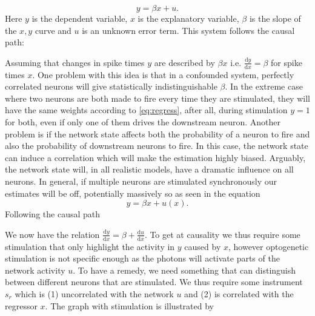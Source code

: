 \documentclass[11pt]{article}
\newcommand{\de}[2]{\frac{\mathrm{d} #1}{\mathrm{d} #2}}
\begin{document}
\begin{equation}
y = \beta x + u.
\label{eq:regress}
\end{equation}
Here $ y $ is the dependent variable, $ x $ is the explanatory variable, $ \beta $ is the slope of the $ x,y $ curve and $ u $ is an unknown error term. This system follows the causal path:
\begin{center}
\end{center}
Assuming that changes in spike times $ y $ are described by $ \beta x $ i.e. $ \de{y}{x} = \beta $ for spike times $ x $. One problem with this idea is that in a confounded system, perfectly correlated neurons will give statistically indistinguishable $ \beta $. In the extreme case where two neurons are both made to fire every time they are stimulated, they will have the same weights according to \cref{eq:regress}, after all, during stimulation  $ y=1 $ for both, even if only one of them drives the downstream neuron. Another problem is if the network state affects both the probability of a neuron to fire and also the probability of downstream neurons to fire. In this case, the network state can induce a correlation which will make the estimation highly biased. Arguably, the network state will, in all realistic models, have a dramatic influence on all neurons. In general, if multiple neurons are stimulated synchronously our estimates will be off, potentially massively so as seen in the equation
\begin{equation}
y = \beta x + u(x).
\end{equation}
Following the causal path

\begin{center}
\end{center}
We now have the relation $ \de{y}{x} = \beta + \de{u}{x} $. To get at causality we thus require some stimulation that only highlight the activity in $ y $ caused by $ x $, however optogenetic stimulation is not specific enough as the photons will activate parts of the network activity $ u $. To have a remedy, we need something that can distinguish between different neurons that are stimulated. We thus require some instrument $ s_{r} $ which is (1) uncorrelated with the network $ u $ and (2) is correlated with the regressor $ x $. The graph with stimulation is illustrated by
\end{document}
